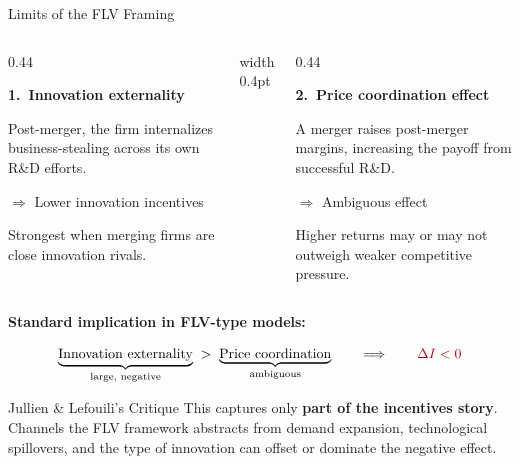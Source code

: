 \documentclass[10pt, aspectratio=169]{beamer}
\newcommand{\negg}[1]{\textcolor{softred}{#1}}
\newcommand{\amb}[1]{\textcolor{softorange}{#1}}
\begin{document}
\begin{frame}{Limits of the FLV Framing}
\small

\begin{columns}[T,onlytextwidth]
\begin{column}{0.44\textwidth}

\textbf{1.\ Innovation externality}

\vspace{0.4em}
Post-merger, the firm internalizes business-stealing across its own R\&D efforts.

\vspace{0.4em}
$\Longrightarrow$ \negg{Lower innovation incentives}

\vspace{0.2em}
{\footnotesize Strongest when merging firms are close innovation rivals.}

\end{column}

\hfill
{\color{darkblue!25}\vrule width 0.4pt}
\hfill

\begin{column}{0.44\textwidth}

\textbf{2.\ Price coordination effect}

\vspace{0.4em}
A merger raises post-merger margins, increasing the payoff from successful R\&D.

\vspace{0.4em}
$\Longrightarrow$ \amb{Ambiguous effect}

\vspace{0.2em}
{\footnotesize Higher returns may or may not outweigh weaker competitive pressure.}

\end{column}
\end{columns}

\vspace{1.2em}

\begin{center}
\textbf{Standard implication in FLV-type models:}

\vspace{0.5em}
\[
\underbrace{\text{Innovation externality}}_{\text{large, negative}}
\;>\;
\underbrace{\text{Price coordination}}_{\text{ambiguous}}
\qquad\Longrightarrow\qquad
{\color{red!75!black}\Delta I < 0}
\]
\end{center}

\vspace{0.8em}

\begin{alertblock}{Jullien \& Lefouili's Critique}
This captures only \textbf{part of the incentives story}. Channels the FLV framework abstracts from demand expansion, technological spillovers, and the type of innovation can offset or dominate the negative effect.
\end{alertblock}

\end{frame}
\end{document}
